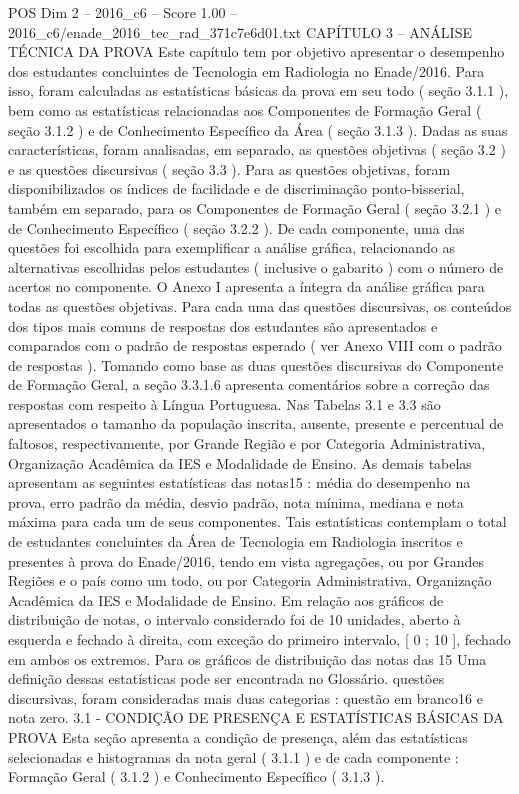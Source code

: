 \begin{textsample}{POS Dim 2 – 2016\_c6 – Score 1.00 – 2016\_c6/enade\_2016\_tec\_rad\_371c7e6d01.txt}  \label{ex:f2_pos_210}
CAPÍTULO 3 – ANÁLISE TÉCNICA DA PROVA Este capítulo tem por objetivo apresentar o desempenho dos estudantes concluintes de Tecnologia em Radiologia no Enade/2016.
Para isso, foram calculadas as estatísticas básicas da prova em seu todo ( seção 3.1.1 ), bem como as estatísticas relacionadas aos Componentes de Formação Geral ( seção 3.1.2 ) e de Conhecimento Específico da Área ( seção 3.1.3 ).
Dadas as suas características, foram analisadas, em separado, as questões objetivas ( seção 3.2 ) e as questões discursivas ( seção 3.3 ).
Para as questões objetivas, foram disponibilizados os índices de facilidade e de discriminação ponto-bisserial, também em separado, para os Componentes de Formação Geral ( seção 3.2.1 ) e de Conhecimento Específico ( seção 3.2.2 ).
De cada componente, uma das questões foi escolhida para exemplificar a análise gráfica, relacionando as alternativas escolhidas pelos estudantes ( inclusive o gabarito ) com o número de acertos no componente.
O Anexo I apresenta a íntegra da análise gráfica para todas as questões objetivas.
Para cada uma das questões discursivas, os conteúdos dos tipos mais comuns de respostas dos estudantes são apresentados e comparados com o padrão de respostas esperado ( ver Anexo VIII com o padrão de respostas ).
Tomando como base as duas questões discursivas do Componente de Formação Geral, a seção 3.3.1.6 apresenta comentários sobre a correção das respostas com respeito à Língua Portuguesa.
Nas Tabelas 3.1 e 3.3 são apresentados o tamanho da população inscrita, ausente, presente e percentual de faltosos, respectivamente, por Grande Região e por Categoria Administrativa, Organização Acadêmica da IES e Modalidade de Ensino.
As demais tabelas apresentam as seguintes estatísticas das notas15 : média do desempenho na prova, erro padrão da média, desvio padrão, nota mínima, mediana e nota máxima para cada um de seus componentes.
Tais estatísticas contemplam o total de estudantes concluintes da Área de Tecnologia em Radiologia inscritos e presentes à prova do Enade/2016, tendo em vista agregações, ou por Grandes Regiões e o país como um todo, ou por Categoria Administrativa, Organização Acadêmica da IES e Modalidade de Ensino.
Em relação aos gráficos de distribuição de notas, o intervalo considerado foi de 10 unidades, aberto à esquerda e fechado à direita, com exceção do primeiro intervalo, [ 0 ; 10 ], fechado em ambos os extremos.
Para os gráficos de distribuição das notas das 15 Uma definição dessas estatísticas pode ser encontrada no Glossário. questões discursivas, foram consideradas mais duas categorias : questão em branco16 e nota zero. 3.1 - CONDIÇÃO DE PRESENÇA E ESTATÍSTICAS BÁSICAS DA PROVA Esta seção apresenta a condição de presença, além das estatísticas selecionadas e histogramas da nota geral ( 3.1.1 ) e de cada componente : Formação Geral ( 3.1.2 ) e Conhecimento Específico ( 3.1.3 ).

\end{textsample}
